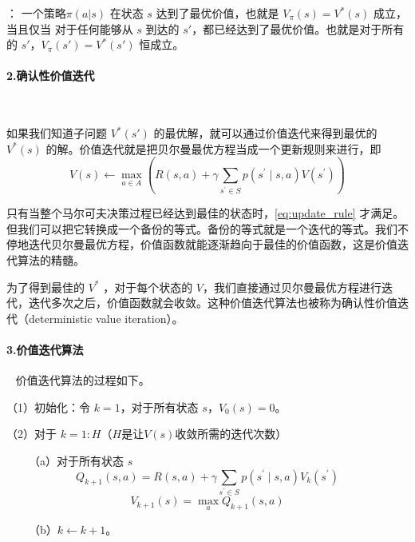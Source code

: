 ：
一个策略$\pi(a|s)$ 在状态 $s$ 达到了最优价值，也就是 $V_{\pi}(s) = V^{*}(s)$ 成立，当且仅当
对于任何能够从 $s$ 到达的 $s'$，都已经达到了最优价值。也就是对于所有的 $s'$，$V_{\pi}(s') = V^{*}(s')$ 恒成立。

\paragraph{2.确认性价值迭代}~{}
\newline

如果我们知道子问题 $V^{*}(s')$ 的最优解，就可以通过价值迭代来得到最优的 $V^{*}(s)$ 的解。价值迭代就是把贝尔曼最优方程当成一个更新规则来进行，即
\begin{equation}
  V(s) \leftarrow \max _{a \in A}\left(R(s, a)+\gamma \sum_{s^{\prime} \in S} p\left(s^{\prime} \mid s, a\right) V\left(s^{\prime}\right)\right)
  \label{eq:update_rule}
\end{equation}

只有当整个马尔可夫决策过程已经达到最佳的状态时，\eqref{eq:update_rule} 才满足。但我们可以把它转换成一个备份的等式。备份的等式就是一个迭代的等式。我们不停地迭代贝尔曼最优方程，价值函数就能逐渐趋向于最佳的价值函数，这是价值迭代算法的精髓。

为了得到最佳的 $V^*$ ，对于每个状态的 $V$，我们直接通过贝尔曼最优方程进行迭代，迭代多次之后，价值函数就会收敛。这种价值迭代算法也被称为确认性价值迭代（deterministic value iteration）。

\paragraph{3.价值迭代算法}~{}
\newline
价值迭代算法的过程如下。

（1）初始化：令 $k=1$，对于所有状态 $s$，$V_0(s)=0$。

（2）对于 $k=1:H$（$H$是让$V(s)$收敛所需的迭代次数）
  
~~~~（a）对于所有状态 $s$
    \begin{equation}
      \label{eq:value_iteration_1}
Q_{k+1}(s, a)=R(s, a)+\gamma \sum_{s^{\prime} \in S} p\left(s^{\prime} \mid s, a\right) V_{k}\left(s^{\prime}\right)
    \end{equation}
    \begin{equation}
    \label{eq:value_iteration_2}
V_{k+1}(s)=\max _{a} Q_{k+1}(s, a)
    \end{equation}
    
~~~~（b）$k \leftarrow k+1$。
  
